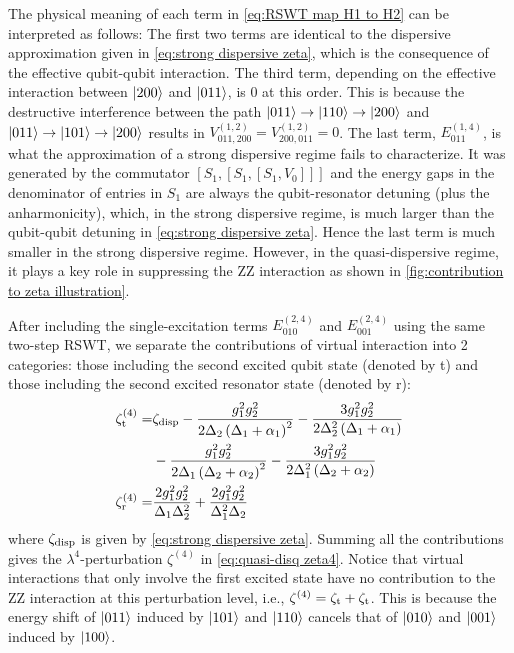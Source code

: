 \documentclass[%
 reprint,
 amsmath,amssymb,
 aps,
pra,
noeprint,
superscriptaddress,
]{revtex4-2}
\begin{document}
The physical meaning of each term in \cref{eq:RSWT map H1 to H2} can be interpreted as follows:
The first two terms are identical to the dispersive approximation given in \cref{eq:strong dispersive zeta}, which is the consequence of the effective qubit-qubit interaction.
The third term, depending on the effective interaction between $\ket{200}$ and $\ket{011}$, is 0 at this order.
This is because the destructive interference between the path $\ket{011} \rightarrow \ket{110} \rightarrow \ket{200}$ and $\ket{011} \rightarrow \ket{101} \rightarrow \ket{200}$ results in $V_{011,200}^{(1,2)}=V_{200,011}^{(1,2)}=0$.
The last term, $E_{011}^{(1,4)}$, is what the approximation of a strong dispersive regime fails to characterize.
It was generated by the commutator $[S_1, [S_1, [S_1, V_0]]]$ and the energy gaps in the denominator of entries in $S_1$ are always the qubit-resonator detuning (plus the anharmonicity), which, in the strong dispersive regime, is much larger than the qubit-qubit detuning in \cref{eq:strong dispersive zeta}.
Hence the last term is much smaller in the strong dispersive regime.
However, in the quasi-dispersive regime, it plays a key role in suppressing the ZZ interaction as shown in \cref{fig:contribution to zeta illustration}.

After including the single-excitation terms $E_{010}^{(2,4)}$ and $E_{001}^{(2,4)}$ using the same two-step RSWT, we separate the contributions of virtual interaction into 2 categories: those including the second excited qubit state (denoted by t) and those including the second excited resonator state (denoted by r):
\begin{align}
    \zeta^{(4)}_{\textnormal{t}}
    = \nonumber &
    \zeta_{\textnormal{disp}}
    - \frac{g_{1}^{2} g_{2}^{2}}{2 \Delta_{2}  \left(\Delta_{1} + \alpha_{1}\right)^2}
    - \frac{3 g_{1}^{2} g_{2}^{2}}{2 \Delta_{2}^{2} \left(\Delta_{1} + \alpha_{1}\right)}
    \\ &
    - \frac{g_{1}^{2} g_{2}^{2}}{2 \Delta_{1}  \left(\Delta_{2} + \alpha_{2}\right)^2}
    - \frac{3 g_{1}^{2} g_{2}^{2}}{2 \Delta_{1}^{2} \left(\Delta_{2} + \alpha_{2}\right)}
    \\
    \zeta^{(4)}_{\textnormal{r}}
    = &
    \frac{2 g_{1}^{2} g_{2}^{2}}{\Delta_{1} \Delta_{2}^{2}} + \frac{2 g_{1}^{2} g_{2}^{2}}{\Delta_{1}^{2} \Delta_{2}}
\end{align}
where $\zeta_{\textnormal{disp}}$ is given by \cref{eq:strong dispersive zeta}.
Summing all the contributions gives the $\lambda^4$-perturbation $\zeta^{(4)}$ in \cref{eq:quasi-disq zeta4}.
Notice that virtual interactions that only involve the first excited state have no contribution to the ZZ interaction at this perturbation level, i.e., $\zeta^{(4)} = \zeta_{\textnormal{t}} + \zeta_{\textnormal{t}}$.
This is because the energy shift of $\ket{011}$ induced by $\ket{101}$ and $\ket{110}$ cancels that of $\ket{010}$ and $\ket{001}$ induced by $\ket{100}$.
\end{document}
